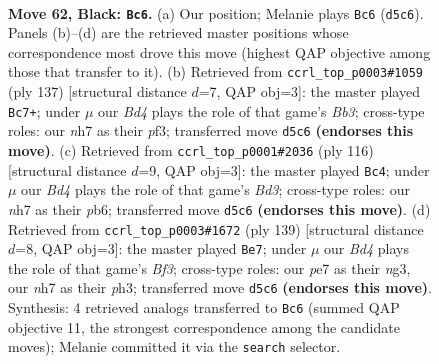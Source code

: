 \documentclass[11pt]{article}
\begin{document}
\clearpage

\begin{figure}[p]\centering
\begin{subfigure}{0.46\textwidth}\centering
\resizebox{\linewidth}{!}{%
\newchessgame
\chessboard[
  setfen={8/P3P1KN/8/2kb4/8/8/5p2/8 b - - 0 62},
  showmover=false,
  pgfstyle=straightmove, color=movearrow, markmove={d5-c6}
]}
\caption{}
\end{subfigure}\hfill
\begin{subfigure}{0.46\textwidth}\centering
\resizebox{\linewidth}{!}{%
\newchessgame
\chessboard[
  setfen={8/8/1bk4p/7P/8/5PK1/8/8 b - - 0 69},
  showmover=false,
  pgfstyle=straightmove, color=movearrow, markmove={b6-c7}
]}
\caption{}
\end{subfigure}
\\[4pt]
\begin{subfigure}{0.46\textwidth}\centering
\resizebox{\linewidth}{!}{%
\newchessgame
\chessboard[
  setfen={8/6k1/1pp5/8/p7/2KB4/8/8 w - - 26 59},
  showmover=false,
  pgfstyle=straightmove, color=movearrow, markmove={d3-c4}
]}
\caption{}
\end{subfigure}\hfill
\begin{subfigure}{0.46\textwidth}\centering
\resizebox{\linewidth}{!}{%
\newchessgame
\chessboard[
  setfen={8/5k2/5b1K/8/5P2/6NP/8/8 b - - 6 70},
  showmover=false,
  pgfstyle=straightmove, color=movearrow, markmove={f6-e7}
]}
\caption{}
\end{subfigure}
\caption{\textbf{Move 62, Black: \texttt{Bc6}.} (a) Our position; Melanie plays \texttt{Bc6} (\texttt{d5c6}). Panels (b)--(d) are the retrieved master positions whose correspondence most drove this move (highest QAP objective among those that transfer to it). (b) Retrieved from \texttt{ccrl\_top\_p0003\#1059} (ply 137) [structural distance $d$=7, QAP obj=3]: the master played \texttt{Bc7+}; under $\mu$ our \emph{Bd4} plays the role of that game's \emph{Bb3}; cross-type roles: our \emph{n}h7 as their \emph{p}f3; transferred move \texttt{d5c6} \textbf{(endorses this move)}. (c) Retrieved from \texttt{ccrl\_top\_p0001\#2036} (ply 116) [structural distance $d$=9, QAP obj=3]: the master played \texttt{Bc4}; under $\mu$ our \emph{Bd4} plays the role of that game's \emph{Bd3}; cross-type roles: our \emph{n}h7 as their \emph{p}b6; transferred move \texttt{d5c6} \textbf{(endorses this move)}. (d) Retrieved from \texttt{ccrl\_top\_p0003\#1672} (ply 139) [structural distance $d$=8, QAP obj=3]: the master played \texttt{Be7}; under $\mu$ our \emph{Bd4} plays the role of that game's \emph{Bf3}; cross-type roles: our \emph{p}e7 as their \emph{n}g3, our \emph{n}h7 as their \emph{p}h3; transferred move \texttt{d5c6} \textbf{(endorses this move)}. Synthesis: 4 retrieved analogs transferred to \texttt{Bc6} (summed QAP objective 11, the strongest correspondence among the candidate moves); Melanie committed it via the \texttt{search} selector.}
\label{fig:thought-m123}
\end{figure}
\end{document}
